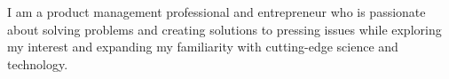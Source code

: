 

\begin{cvparagraph}

I am a product management professional and entrepreneur who is passionate about solving problems and creating solutions to pressing issues while exploring my interest and expanding my familiarity with cutting-edge science and technology.

\end{cvparagraph}





